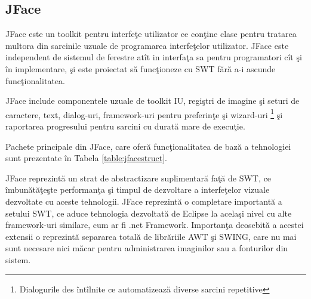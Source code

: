 \subsection{JFace}
JFace este un toolkit pentru interfeţe utilizator ce conţine clase pentru 
tratarea multora din sarcinile uzuale de programarea interfeţelor utilizator. 
JFace este independent de sistemul de ferestre atît in interfaţa sa pentru 
programatori cît şi în implementare, şi este proiectat să funcţioneze cu SWT 
fără a-i ascunde funcţionalitatea.

JFace include componentele uzuale de toolkit IU, regiştri de imagine şi seturi 
de caractere, text, dialog-uri, framework-uri pentru preferinţe şi wizard-uri
\footnote{Dialogurile des întîlnite ce automatizează diverse sarcini repetitive}
şi raportarea progresului pentru sarcini cu durată mare de execuţie.
\cite{jface}

Pachete principale din JFace, care oferă funcţionalitatea de bază a tehnologiei 
sunt prezentate în Tabela \ref{table:jfacestruct}.

JFace reprezintă un strat de abstractizare suplimentară faţă de SWT, ce
îmbunătăţeşte performanţa şi timpul de dezvoltare a interfeţelor vizuale
dezvoltate cu aceste tehnologii. JFace reprezintă o completare importantă a
setului SWT, ce aduce tehnologia dezvoltată de Eclipse la acelaşi nivel cu alte
framework-uri similare, cum ar fi .net Framework. Importanţa deosebită a acestei
extensii o reprezintă separarea totală de librăriile AWT şi SWING, care nu mai
sunt necesare nici măcar pentru administrarea imaginilor sau a fonturilor din
sistem.

